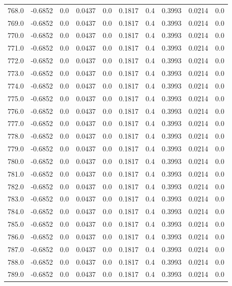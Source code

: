 \begin{longtable}{lrrrrrrrrr}
768.0 & -0.6852 & 0.0 & 0.0437 & 0.0 & 0.1817 & 0.4 & 0.3993 & 0.0214 & 0.0 \\
769.0 & -0.6852 & 0.0 & 0.0437 & 0.0 & 0.1817 & 0.4 & 0.3993 & 0.0214 & 0.0 \\
770.0 & -0.6852 & 0.0 & 0.0437 & 0.0 & 0.1817 & 0.4 & 0.3993 & 0.0214 & 0.0 \\
771.0 & -0.6852 & 0.0 & 0.0437 & 0.0 & 0.1817 & 0.4 & 0.3993 & 0.0214 & 0.0 \\
772.0 & -0.6852 & 0.0 & 0.0437 & 0.0 & 0.1817 & 0.4 & 0.3993 & 0.0214 & 0.0 \\
773.0 & -0.6852 & 0.0 & 0.0437 & 0.0 & 0.1817 & 0.4 & 0.3993 & 0.0214 & 0.0 \\
774.0 & -0.6852 & 0.0 & 0.0437 & 0.0 & 0.1817 & 0.4 & 0.3993 & 0.0214 & 0.0 \\
775.0 & -0.6852 & 0.0 & 0.0437 & 0.0 & 0.1817 & 0.4 & 0.3993 & 0.0214 & 0.0 \\
776.0 & -0.6852 & 0.0 & 0.0437 & 0.0 & 0.1817 & 0.4 & 0.3993 & 0.0214 & 0.0 \\
777.0 & -0.6852 & 0.0 & 0.0437 & 0.0 & 0.1817 & 0.4 & 0.3993 & 0.0214 & 0.0 \\
778.0 & -0.6852 & 0.0 & 0.0437 & 0.0 & 0.1817 & 0.4 & 0.3993 & 0.0214 & 0.0 \\
779.0 & -0.6852 & 0.0 & 0.0437 & 0.0 & 0.1817 & 0.4 & 0.3993 & 0.0214 & 0.0 \\
780.0 & -0.6852 & 0.0 & 0.0437 & 0.0 & 0.1817 & 0.4 & 0.3993 & 0.0214 & 0.0 \\
781.0 & -0.6852 & 0.0 & 0.0437 & 0.0 & 0.1817 & 0.4 & 0.3993 & 0.0214 & 0.0 \\
782.0 & -0.6852 & 0.0 & 0.0437 & 0.0 & 0.1817 & 0.4 & 0.3993 & 0.0214 & 0.0 \\
783.0 & -0.6852 & 0.0 & 0.0437 & 0.0 & 0.1817 & 0.4 & 0.3993 & 0.0214 & 0.0 \\
784.0 & -0.6852 & 0.0 & 0.0437 & 0.0 & 0.1817 & 0.4 & 0.3993 & 0.0214 & 0.0 \\
785.0 & -0.6852 & 0.0 & 0.0437 & 0.0 & 0.1817 & 0.4 & 0.3993 & 0.0214 & 0.0 \\
786.0 & -0.6852 & 0.0 & 0.0437 & 0.0 & 0.1817 & 0.4 & 0.3993 & 0.0214 & 0.0 \\
787.0 & -0.6852 & 0.0 & 0.0437 & 0.0 & 0.1817 & 0.4 & 0.3993 & 0.0214 & 0.0 \\
788.0 & -0.6852 & 0.0 & 0.0437 & 0.0 & 0.1817 & 0.4 & 0.3993 & 0.0214 & 0.0 \\
789.0 & -0.6852 & 0.0 & 0.0437 & 0.0 & 0.1817 & 0.4 & 0.3993 & 0.0214 & 0.0 \\

\end{longtable}
